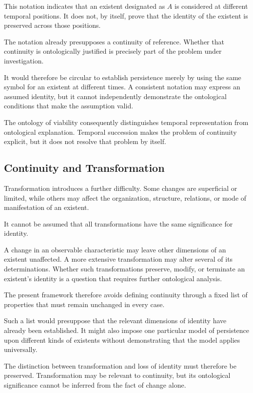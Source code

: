 This notation indicates that an existent designated as \(A\) is considered at different temporal positions. It does not, by itself, prove that the identity of the existent is preserved across those positions.

The notation already presupposes a continuity of reference. Whether that continuity is ontologically justified is precisely part of the problem under investigation.

It would therefore be circular to establish persistence merely by using the same symbol for an existent at different times. A consistent notation may express an assumed identity, but it cannot independently demonstrate the ontological conditions that make the assumption valid.

The ontology of viability consequently distinguishes temporal representation from ontological explanation. Temporal succession makes the problem of continuity explicit, but it does not resolve that problem by itself.

\subsection{Continuity and Transformation}

Transformation introduces a further difficulty. Some changes are superficial or limited, while others may affect the organization, structure, relations, or mode of manifestation of an existent.

It cannot be assumed that all transformations have the same significance for identity.

A change in an observable characteristic may leave other dimensions of an existent unaffected. A more extensive transformation may alter several of its determinations. Whether such transformations preserve, modify, or terminate an existent's identity is a question that requires further ontological analysis.

The present framework therefore avoids defining continuity through a fixed list of properties that must remain unchanged in every case.

Such a list would presuppose that the relevant dimensions of identity have already been established. It might also impose one particular model of persistence upon different kinds of existents without demonstrating that the model applies universally.

The distinction between transformation and loss of identity must therefore be preserved. Transformation may be relevant to continuity, but its ontological significance cannot be inferred from the fact of change alone.

